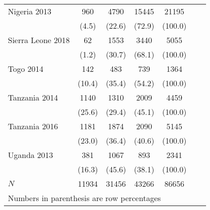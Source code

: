 \begin{tabular}{l*{6}{c}}
Nigeria 2013&                  {960}&                {4790}&           {15445}&             {21195}\\
&                                              {(4.5)}&      {(22.6)}&             {(72.9)}&           {(100.0)}\\
Sierra Leone 2018&             {62}&                {1553}&           {3440}&             {5055}\\
&                                              {(1.2)}&      {(30.7)}&             {(68.1)}&           {(100.0)}\\
Togo 2014&                             {142}&               {483}&           {739}&             {1364}\\
&                                              {(10.4)}&     {(35.4)}&             {(54.2)}&           {(100.0)}\\
Tanzania 2014&                 {1140}&               {1310}&           {2009}&             {4459}\\
&                                              {(25.6)}&     {(29.4)}&             {(45.1)}&           {(100.0)}\\
Tanzania 2016&                 {1181}&               {1874}&           {2090}&             {5145}\\
&                                              {(23.0)}&     {(36.4)}&             {(40.6)}&           {(100.0)}\\
Uganda 2013&                   {381}&               {1067}&           {893}&             {2341}\\
&                                              {(16.3)}&     {(45.6)}&             {(38.1)}&           {(100.0)}\\
\hline
\(N\)    &                             {11934}&       {31456}&               {43266}&        {86656}\\
\hline\hline
\multicolumn{6}{l}{\footnotesize Numbers in parenthesis are row percentages}\\
\end{tabular}